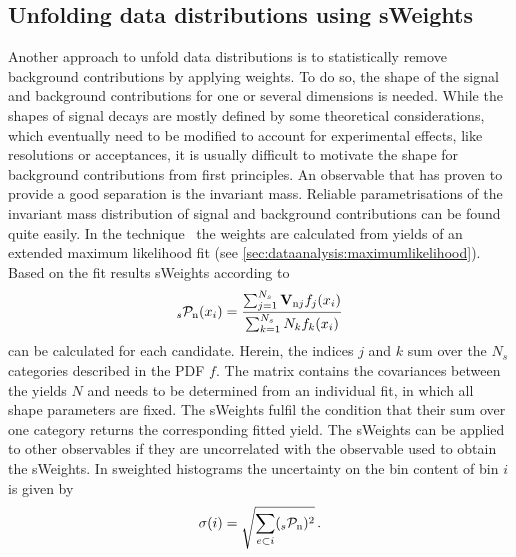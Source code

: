 
\subsection{Unfolding data distributions using sWeights}
\label{sec:dataanalysis:selection:splot}

Another approach to unfold data distributions is to statistically remove
background contributions by applying weights. To do so, the shape of the
signal and background contributions for one or several dimensions is needed.
While the shapes of signal decays are mostly defined by some theoretical
considerations, which eventually need to be modified to account for
experimental effects, like resolutions or acceptances, it is usually difficult
to motivate the shape for background contributions from first principles. An
observable that has proven to provide a good separation is the invariant mass.
Reliable parametrisations of the invariant mass distribution of signal and
background contributions can be found quite easily. In the \sPlot
technique~\cite{Pivk:2004ty} the weights are calculated from yields of an
extended maximum likelihood fit (see
\cref{sec:dataanalysis:maximumlikelihood}). Based on the fit results sWeights
according to
\begin{align}
	_{s}\mathcal{P}_\text{n}(x_i) = \frac{\sum_{j = 1}^{N_s}\mathbf{V}_{\text{n}j}f_j(x_i)}{\sum_{k = 1}^{N_s} N_k f_k(x_i)}
\label{eq:dataanalysis:selection:splot:weightdefinition}
\end{align}
can be calculated for each candidate. Herein, the indices $j$ and $k$ sum over
the $N_s$ categories described in the PDF $f$. The matrix  contains
the covariances between the yields $N$ and needs to be determined from an
individual fit, in which all shape parameters are fixed. The sWeights
fulfil the condition that their sum over one category returns the
corresponding fitted yield. The sWeights can be applied to other observables
if they are uncorrelated with the observable used to obtain the sWeights. In
sweighted histograms the uncertainty on the bin content of bin $i$ is given by
\begin{align}
	\sigma(i) = \sqrt{\sum_{e \subset i} (_{s}\mathcal{P}_\text{n})^2}\,.
\label{eq:dataanalysis:selection:splot:weighterror}
\end{align}